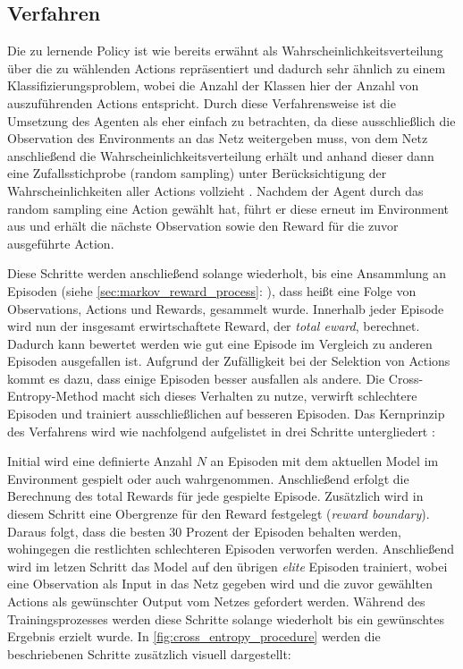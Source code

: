\documentclass[11pt]{scrartcl}
\begin{document}
\subsection{Verfahren}
Die zu lernende Policy ist wie bereits erwähnt als Wahrscheinlichkeitsverteilung über die 
zu wählenden Actions repräsentiert und dadurch sehr ähnlich zu einem Klassifizierungsproblem,
wobei die Anzahl der Klassen hier der Anzahl von auszuführenden Actions entspricht. Durch
diese Verfahrensweise ist die Umsetzung des Agenten als eher einfach zu betrachten, da
diese ausschließlich die Observation des Environments an das Netz weitergeben muss, von
dem Netz anschließend die Wahrscheinlichkeitsverteilung erhält und anhand dieser dann eine
Zufallsstichprobe (random sampling) unter Berücksichtigung der Wahrscheinlichkeiten aller
Actions vollzieht \cite[~S.78]{L2018}. Nachdem der Agent durch das random sampling eine
Action gewählt hat, führt er diese erneut im Environment aus und erhält die nächste
Observation sowie den Reward für die zuvor ausgeführte Action.

Diese Schritte werden anschließend solange wiederholt, bis eine Ansammlung an Episoden (siehe 
\autoref{sec:markov_reward_process}: ), dass heißt eine Folge
von Observations, Actions und Rewards, gesammelt wurde. Innerhalb jeder Episode wird nun der
insgesamt erwirtschaftete Reward, der \textit{total eward}, berechnet. Dadurch kann bewertet werden
wie gut eine Episode im Vergleich zu anderen Episoden ausgefallen ist. Aufgrund der Zufälligkeit
bei der Selektion von Actions kommt es dazu, dass einige Episoden besser ausfallen als andere.
Die Cross-Entropy-Method macht sich dieses Verhalten zu nutze, verwirft schlechtere Episoden und
trainiert ausschließlichen auf besseren Episoden. Das Kernprinzip des Verfahrens wird wie nachfolgend
aufgelistet in drei Schritte untergliedert \cite[~S.80 f.]{L2018}:

Initial wird eine definierte Anzahl $N$ an Episoden mit dem aktuellen Model im Environment gespielt
oder auch wahrgenommen. Anschließend erfolgt die Berechnung des total Rewards für jede gespielte
Episode. Zusätzlich wird in diesem Schritt eine Obergrenze für den Reward festgelegt 
(\textit{reward boundary}). Daraus folgt, dass die besten 30 Prozent der Episoden behalten werden,
wohingegen die restlichten schlechteren Episoden verworfen werden. Anschließend wird im letzen Schritt
das Model auf den übrigen \textit{elite} Episoden trainiert, wobei eine Observation als Input in das
Netz gegeben wird und die zuvor gewählten Actions als gewünschter Output vom Netzes gefordert werden.
Während des Trainingsprozesses werden diese Schritte solange wiederholt bis ein gewünschtes
Ergebnis erzielt wurde. In \autoref{fig:cross_entropy_procedure} werden die beschriebenen Schritte
zusätzlich visuell dargestellt:
\end{document}
